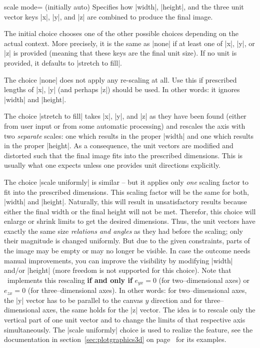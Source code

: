 \begin{pgfplotskey}{scale mode= (initially auto)}
	Specifies how |width|, |height|, and the three unit vector keys |x|, |y|, and |z| are combined to produce the final image.

	The initial choice  chooses one of the other possible choices depending on the actual context. More precisely, it is the same as |none| if at least one of |x|, |y|, or |z| is provided (meaning that these keys are the final unit size). If no unit is provided, it defaults to |stretch to fill|.

	The choice |none| does not apply any re-scaling at all. Use this if prescribed lengths of |x|, |y| (and perhaps |z|) should be used. In other words: it ignores |width| and |height|.

	The choice |stretch to fill| takes |x|, |y|, and |z| as they have been found (either from user input or from some automatic processing) and rescales the axis with two \emph{separate} scales: one which results in the proper |width| and one which results in the proper |height|. As a consequence, the unit vectors are modified and distorted such that the final image fits into the prescribed dimensions. This is usually what one expects unless one provides unit directions explicitly.
	
	The choice |scale uniformly| is similar -- but it applies only \emph{one} scaling factor to fit into the prescribed dimensions. This scaling factor will be the same for both, |width| and |height|. Naturally, this will result in unsatisfactory results because either the final width or the final height will not be met. Therefor, this choice will enlarge or shrink limits to get the desired dimensions. Thus, the unit vectors have exactly the same size \emph{relations and angles} as they had before the scaling; only their magnitude is changed uniformly. But due to the given constraints, parts of the image may be empty or may no longer be visible. In case the outcome needs manual improvements, you can improve the visibility by modifying |width| and/or |height| (more freedom is not supported for this choice). Note that \PGFPlots\ implements this rescaling \textbf{if and only if} $e_{yx} = 0$ (for two--dimensional axes) or $e_{zx} = 0$ (for three--dimensional axes). In other words: for two--dimensional axes, the |y| vector has to be parallel to the canvas $y$ direction and for three--dimensional axes, the same holds for the |z| vector. The idea is to rescale only the vertical part of one unit vector and to change the limits of that respective axis simultaneously. The |scale uniformly| choice is used to realize the  feature, see the documentation in section~\ref{sec:plotgraphics3d} on page~\pageref{sec:plotgraphics3d} for its examples.

\end{pgfplotskey}

